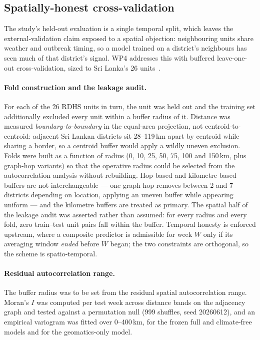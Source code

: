 \subsection{Spatially-honest cross-validation}
\label{sec:methods-wp4}

The study's held-out evaluation is a single temporal split, which leaves the external-validation claim exposed to a spatial objection: neighbouring units share weather and outbreak timing, so a model trained on a district's neighbours has seen much of that district's signal. WP4 addresses this with buffered leave-one-out cross-validation, sized to Sri Lanka's 26 units~\cite{Roberts2017,Valavi2019}.

\paragraph{Fold construction and the leakage audit.} For each of the 26 RDHS units in turn, the unit was held out and the training set additionally excluded every unit within a buffer radius of it. Distance was measured \emph{boundary-to-boundary} in the equal-area projection, not centroid-to-centroid: adjacent Sri Lankan districts sit 28--119\,km apart by centroid while sharing a border, so a centroid buffer would apply a wildly uneven exclusion. Folds were built as a function of radius (0, 10, 25, 50, 75, 100 and 150\,km, plus graph-hop variants) so that the operative radius could be selected from the autocorrelation analysis without rebuilding. Hop-based and kilometre-based buffers are not interchangeable --- one graph hop removes between 2 and 7 districts depending on location, applying an uneven buffer while appearing uniform --- and the kilometre buffers are treated as primary. The spatial half of the leakage audit was asserted rather than assumed: for every radius and every fold, zero train--test unit pairs fall within the buffer. Temporal honesty is enforced upstream, where a composite predictor is admissible for week $W$ only if its averaging window \emph{ended} before $W$ began; the two constraints are orthogonal, so the scheme is spatio-temporal.

\paragraph{Residual autocorrelation range.} The buffer radius was to be set from the residual spatial autocorrelation range. Moran's $I$ was computed per test week across distance bands on the adjacency graph and tested against a permutation null (999 shuffles, seed 20260612), and an empirical variogram was fitted over 0--400\,km, for the frozen full and climate-free models and for the geomatics-only model.

